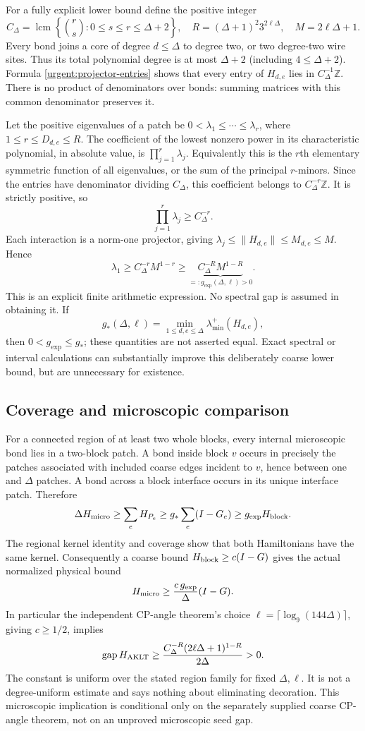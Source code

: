 For a fully explicit lower bound define the positive integer
\[
 C_\Delta=\operatorname{lcm}
 \left\{\binom rs:0\leq s\leq r\leq\Delta+2\right\},\quad
 R=(\Delta+1)^2 3^{2\ell\Delta},\quad M=2\ell\Delta+1.
\]
Every bond joins a core of degree $d\leq\Delta$ to degree two, or two
degree-two wire sites. Thus its total polynomial degree is at most
$\Delta+2$ (including $4\leq\Delta+2$). Formula
\eqref{urgent:projector-entries} shows that every entry of
$H_{d,e}$ lies in $C_\Delta^{-1}\mathbb Z$. There is no product of
denominators over bonds: summing matrices with this common denominator
preserves it.

Let the positive eigenvalues of a patch be
$0<\lambda_1\leq\cdots\leq\lambda_r$, where $1\leq r\leq D_{d,e}\leq R$.
The coefficient of the lowest nonzero power in its characteristic
polynomial, in absolute value, is $\prod_{j=1}^r\lambda_j$.
Equivalently this is the $r$th elementary symmetric function of all
eigenvalues, or the sum of the principal $r$-minors. Since the entries
have denominator dividing $C_\Delta$, this coefficient belongs to
$C_\Delta^{-r}\mathbb Z$. It is strictly positive, so
\[
 \prod_{j=1}^r\lambda_j\geq C_\Delta^{-r}.
\]
Each interaction is a norm-one projector, giving
$\lambda_j\leq\|H_{d,e}\|\leq M_{d,e}\leq M$. Hence
\[
 \lambda_1\geq C_\Delta^{-r}M^{1-r}
 \geq \underbrace{C_\Delta^{-R}M^{1-R}}_{=:g_{\mathrm{exp}}(\Delta,\ell)>0}.
\]
This is an explicit finite arithmetic expression. No spectral gap is
assumed in obtaining it. If
\[
 g_*(\Delta,\ell)=\min_{1\leq d,e\leq\Delta}
                  \lambda_{\min}^{+}(H_{d,e}),
\]
then $0<g_{\mathrm{exp}}\leq g_*$; these quantities are not asserted
equal. Exact spectral or interval calculations can substantially improve
this deliberately coarse lower bound, but are unnecessary for existence.

\subsection{Coverage and microscopic comparison}

For a connected region of at least two whole blocks, every internal
microscopic bond lies in a two-block patch. A bond inside block $v$
occurs in precisely the patches associated with included coarse edges
incident to $v$, hence between one and $\Delta$ patches. A bond across
a block interface occurs in its unique interface patch. Therefore
\[
 \Delta H_{\rm micro}\geq\sum_eH_{P_e}
 \geq g_*\sum_e(I-G_e)
 \geq g_{\rm exp}H_{\rm block}.
\]
The regional kernel identity and coverage show that both Hamiltonians
have the same kernel. Consequently a coarse bound
$H_{\rm block}\geq c(I-G)$ gives the actual normalized physical bound
\[
 H_{\rm micro}\geq\frac{c\,g_{\rm exp}}\Delta(I-G).
\]
In particular the independent CP-angle theorem's choice
$\ell=\lceil\log_9(144\Delta)\rceil$, giving $c\geq1/2$, implies
\[
 \operatorname{gap}H_{\rm AKLT}
 \geq \frac{C_\Delta^{-R}(2\ell\Delta+1)^{1-R}}{2\Delta}>0.
\]
The constant is uniform over the stated region family for fixed
$\Delta,\ell$. It is not a degree-uniform estimate and says nothing
about eliminating decoration. This microscopic implication is conditional
only on the separately supplied coarse CP-angle theorem, not on an
unproved microscopic seed gap.
